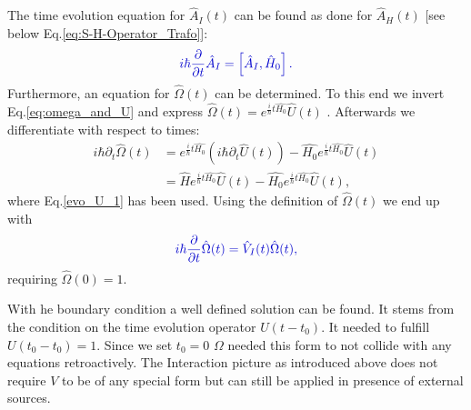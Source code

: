 \documentclass[12pt, titlepage]{article}
\begin{document}
The time evolution equation for $ 	\hat{A}_{I}(t) $ can be found as done for $ \hat{A}_{H}(t) $ $ [ $see below Eq.\enskip\eqref{eq:S-H-Operator_Trafo}]:
\begin{equation}\label{eq:time_evo_equ_Intera}
\textcolor[RGB]{0,0,204}{
	i\hbar
	\frac{\partial}{\partial t}
	\hat{A}_{I}
	=
	\left[ 
	\hat{A}_{I},
	\hat{H}_{0}
	\right] .
}
\end{equation}
Furthermore, an equation for $ \hat{\Omega}(t) $ can be determined. To this end we invert Eq.\enskip\eqref{eq:omega_and_U} and express $  \hat{\Omega}(t) 
  		= e^{\frac{i}{\hbar}t \hat{H_{0}}}
			\hat{U}(t)  $ . Afterwards we differentiate with respect to times: 
\begin{subequations}
\begin{align}
  		i\hbar\partial_{t}\hat{\Omega}(t) 
  		 &= 
  		 e^{\frac{i}{\hbar}t\hat{H_{0}}}
  		 \left(i\hbar\partial_{t}\hat{U}(t) \right)
  		 -
  		 \hat{H_{0}}
   		 e^{\frac{i}{\hbar}t\hat{H_{0}}}
 		 \hat{U}(t)
  		 \\
  		 &=
  		 \hat{H}
  		  e^{\frac{i}{\hbar}t\hat{H_{0}}}  		 
  		 \hat{U}(t)  		 
  		 -
  		 \hat{H_{0}}
  		   e^{\frac{i}{\hbar}t\hat{H_{0}}}
  		 \hat{U}(t),
\end{align}
\end{subequations}
where Eq.\enskip\eqref{evo_U_1} has been used. Using the definition of $ \hat{\Omega}(t) $ we end up with
\begin{equation}\label{eq:time_evo_Omega_interaction}
\textcolor[RGB]{0,0,204}{
	i\hbar
	\frac{\partial}{\partial t}
	\hat{\Omega}(t)
	=
	\hat{V}_{I}(t)
	\hat{\Omega}(t)
,}
\end{equation}
requiring $ \hat{\Omega}(0)=1 $.

With he boundary condition a well defined solution can be found. It stems from the condition on the time evolution operator $ U(t-t_0) $. It needed to fulfill $ U(t_0-t_0)=1 $. Since we set $ t_0 =0 $ $ \Omega $ needed this form to not collide with any equations retroactively.
The Interaction picture as introduced above does not require $ V $ to be of any special form but can still be applied in presence of external sources. 
\end{document}
